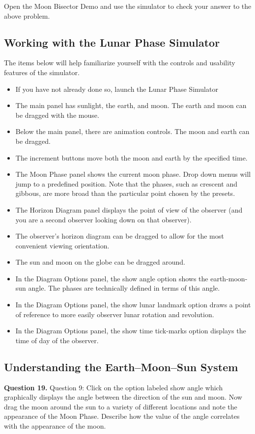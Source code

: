 \documentclass[11pt]{article}
\begin{document}
\noindent
Open the Moon Bisector Demo and use the simulator to check your answer to the above problem.

\subsection{Working with the Lunar Phase Simulator}

The items below will help familiarize yourself with the controls and usability features of the simulator.
\begin{itemize}
\item	If you have not already done so, launch the Lunar Phase Simulator
\item	The main panel has sunlight, the earth, and moon. The earth and moon can be dragged with the mouse.
\item	Below the main panel, there are animation controls. The moon and earth can be dragged.
\item	The increment buttons move both the moon and earth by the specified time.
\item	The Moon Phase panel shows the current moon phase. Drop down menus will jump to a predefined position. Note that the phases, such as crescent and gibbous, are more broad than the particular point chosen by the presets.
\item	The Horizon Diagram panel displays the point of view of the observer (and you are a second observer looking down on that observer).
\item	The observer's horizon diagram can be dragged to allow for the most convenient viewing orientation.
\item	The sun and moon on the globe can be dragged around.
\item	In the Diagram Options panel, the show angle option shows the earth-moon-sun angle. The phases are technically defined in terms of this angle. 
\item	In the Diagram Options panel, the show lunar landmark option draws a point of reference to more easily observer lunar rotation and revolution.
\item	In the Diagram Options panel, the show time tick-marks option displays the time of day of the observer.
\end{itemize}

\subsection{Understanding the Earth--Moon--Sun System}
\noindent
\textbf{Question 19.} 
Question 9: Click on the option labeled show angle which graphically displays the angle between the direction of the sun and moon.  Now drag the moon around the sun to a variety of different locations and note the appearance of the Moon Phase.  Describe how the value of the angle correlates with the appearance of the moon.
\end{document}
